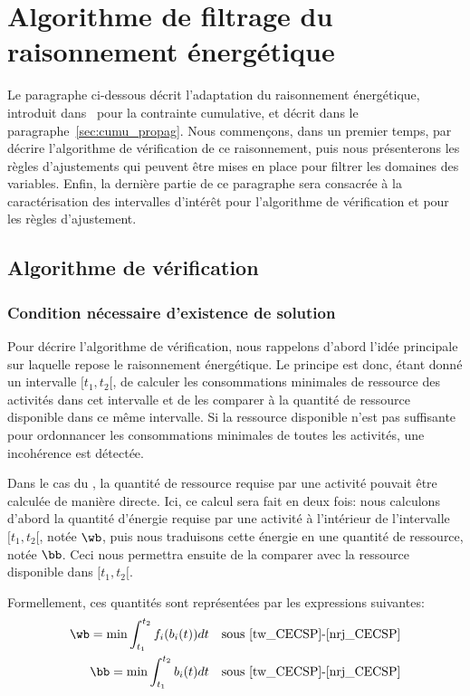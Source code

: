 \section{Algorithme de filtrage du raisonnement énergétique}
\label{sec:ER_CECSP}

Le paragraphe ci-dessous décrit l'adaptation du raisonnement
énergétique, introduit dans~\cite{RELopez} pour la contrainte cumulative,
et décrit dans le paragraphe~\ref{sec:cumu_propag}. Nous commençons,
dans un premier temps, par décrire l'algorithme de vérification de ce
raisonnement, puis nous présenterons les règles d'ajustements qui
peuvent être mises en place pour filtrer les domaines des
variables. Enfin, la dernière partie de ce paragraphe sera consacrée à
la caractérisation des intervalles d'intérêt pour l'algorithme de
vérification et pour les règles d'ajustement.

\subsection{Algorithme de vérification}

\subsubsection{Condition nécessaire d'existence de solution}
Pour décrire l'algorithme de vérification, nous rappelons d'abord
l'idée principale sur laquelle repose le raisonnement énergétique. Le
principe est donc, étant donné un intervalle $[t_1,t_2[$, de calculer
les consommations minimales de ressource des activités dans cet 
intervalle et de les comparer à la quantité de ressource disponible
dans ce même intervalle. Si la ressource disponible n'est pas
suffisante pour ordonnancer les consommations minimales de toutes les
activités, une incohérence est détectée.

Dans le cas du \CUSP, la quantité de ressource requise par une
activité pouvait être calculée de manière directe. Ici, ce calcul sera
fait en deux fois: nous calculons d'abord la quantité d'énergie
requise par une activité à l'intérieur de l'intervalle $[t_1,t_2{[}$,
notée $\wb$, puis nous traduisons cette énergie en une quantité de
ressource, notée $\bb$. Ceci nous permettra ensuite de la comparer
avec la ressource disponible dans $[t_1,t_2{[}$.

Formellement, ces quantités sont représentées par les expressions
suivantes: 
\begin{align}
  \wb= \min \int_{t_1}^{t_2} f_i(b_i(t))dt & & \text{sous 
                                               \eqref{tw_CECSP}-\eqref{nrj_CECSP}}\\
  \bb= \min \int_{t_1}^{t_2} b_i(t)dt & & \text{sous 
                                          \eqref{tw_CECSP}-\eqref{nrj_CECSP}} \label{eq:minConso}
\end{align}

